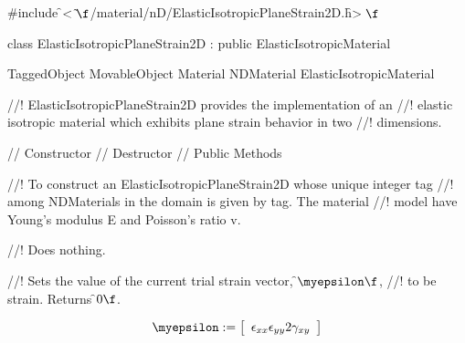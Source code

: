 
\indent \#include \f$<\tilde{ }\f$/material/nD/ElasticIsotropicPlaneStrain2D.h\f$>\f$

\indent class ElasticIsotropicPlaneStrain2D : public ElasticIsotropicMaterial

\indent TaggedObject
\indent MovableObject
\indent\indent Material
\indent\indent\indent NDMaterial
\indent\indent\indent\indent ElasticIsotropicMaterial
\indent\indent\indent\indent{}

//! ElasticIsotropicPlaneStrain2D provides the implementation of an
//! elastic isotropic material which exhibits plane strain behavior in two
//! dimensions.

\indent // Constructor
\indent // Destructor
\indent // Public Methods

//! To construct an ElasticIsotropicPlaneStrain2D whose unique integer tag
//! among NDMaterials in the domain is given by \p tag.  The material
//! model have Young's modulus \p E and Poisson's ratio \p v.

//! Does nothing. 

//! Sets the value of the current trial strain vector, \f$\myepsilon\f$,
//! to be \p strain. Returns \f$0\f$.

\begin{displaymath}
\myepsilon := \left[
   \begin{array}{c}
       \epsilon_{xx}
       \epsilon_{yy}
       2 \gamma_{xy}   
   \end{array} 
 \right]
\end{displaymath}

